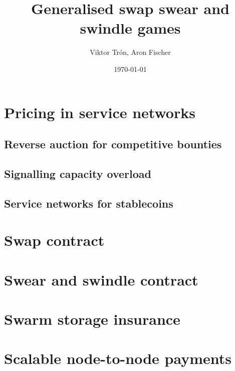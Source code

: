 \documentclass[a4paper,10pt]{article}
\title{Generalised swap swear and swindle games}
\author{Viktor Trón, Aron Fischer}
\date{\today}
\begin{document}
\maketitle
\begin{abstract}
\end{abstract}

\setcounter{tocdepth}{2}
\tableofcontents











\section{Pricing in service networks}

\subsection{Reverse auction for competitive bounties}

\subsection{Signalling capacity overload}
\subsection{Service networks for stablecoins}

\cite{btcmicro2014}
\cite{decker2015fast}
\cite{poon2015bitcoin}  %
\cite{prihodko2016flare} %
\cite{tremback2015universal}  %
\cite{bonneau2014mixcoin} %
\cite{ethersphere2016sw3}
\cite{ethersphere2016smash}
\cite{maymounkov2002kademlia}
\cite{heep2010r}
\cite{malavolta2017concurrency}
\cite{chiesa2017decentralized}
\cite{heilman2016tumblebit}
\cite{green2016bolt}
\cite{miller2017sprites}
\cite{mcdonald2017payment}
\cite{diferrante2017payment}


\appendix
\section{Swap contract}
\section{Swear and swindle contract}
\section{Swarm storage insurance}
\section{Scalable node-to-node payments}
\printglossary
\end{document}
